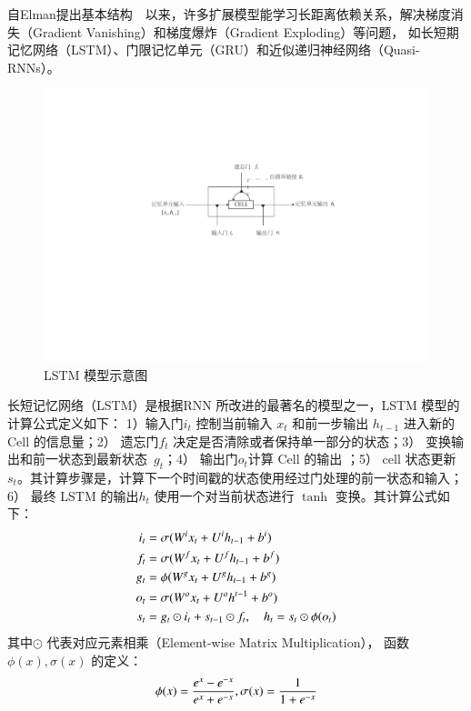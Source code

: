 自Elman提出基本结构~~以来，许多扩展模型能学习长距离依赖关系，解决梯度消失（Gradient Vanishing）和梯度爆炸（Gradient Exploding）等问题， 如长短期记忆网络（LSTM）、门限记忆单元（GRU）和近似递归神经网络（Quasi-RNNs）。

\begin{figure}[!ht]
  \centering
  \includegraphics[width=.8\linewidth]{./figures/lstm.pdf}
  \caption{LSTM 模型示意图}\label{fig:lstm}
\end{figure}

长短记忆网络（LSTM）是根据RNN 所改进的最著名的模型之一，LSTM 模型的计算公式定义如下： 1）输入门$i_t$ 控制当前输入 $x_t$ 和前一步输出 $h_{t−1}$ 进入新的 Cell 的信息量；2） 遗忘门$f_t$ 决定是否清除或者保持单一部分的状态；3） 变换输出和前一状态到最新状态~$g_t$；4） 输出门$o_t$计算 Cell 的输出 ；5） cell 状态更新$s_t$。其计算步骤是，计算下一个时间戳的状态使用经过门处理的前一状态和输入；6） 最终 LSTM 的输出$h_t$ 使用一个对当前状态进行 $\tanh$ 变换。其计算公式如下：
\begin{equation}\label{equ:lstm}
\setlength{\abovedisplayskip}{6pt}
\setlength{\belowdisplayskip}{6pt}
\begin{split}
   i_t&=\sigma(W^i x_t+U^i h_{t-1}+b^i) \\
   f_t&=\sigma(W^f x_t+U^f h_{t-1}+b^f) \\
   g_t&=\phi(W^g x_t+U^g h_{t-1}+b^g) \\
   o_t&=\sigma(W^o x_t+U^o h^{t-1}+b^o) \\
   s_t&=g_t\odot i_t+s_{t-1}\odot f_t,\quad h_t=s_t\odot \phi(o_t)
\end{split}
\end{equation}
其中$\odot$ 代表对应元素相乘（Element-wise Matrix Multiplication）， 函数 $\phi(x), \sigma(x)$ 的定义：
\begin{equation}\label{equ:tanh}
\setlength{\abovedisplayskip}{6pt}
\setlength{\belowdisplayskip}{6pt}
  \phi(x)=\frac{e^x-e^{-x}}{e^x+e^{-x}},\sigma(x)=\frac{1}{1+e^{-x}}
\end{equation}

